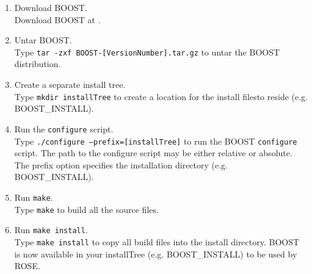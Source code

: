 \begin{enumerate}
     \item Download BOOST. \\
       Download BOOST at .
     \item Untar BOOST. \\
       Type {\tt tar -zxf BOOST-[VersionNumber].tar.gz} to untar the BOOST distribution.
     \item Create a separate install tree. \\
           Type {\tt mkdir installTree} to create a location for the install filesto reside (e.g. BOOST\_INSTALL).
     \item Run the {\tt configure} script. \\
           Type {\tt ./configure --prefix=[installTree]} 
           to run the BOOST {\tt configure} script.  The path to the configure script 
           may be either relative or absolute. The prefix option specifies the installation directory (e.g. BOOST\_INSTALL).
     \item Run {\tt make}. \\
           Type {\tt make} to build all the source files. 
     \item Run {\tt make install}. \\
           Type {\tt make install} to copy all build files into the install directory. BOOST is now available in your 
           installTree (e.g. BOOST\_INSTALL) to be used by ROSE.
\end{enumerate}

